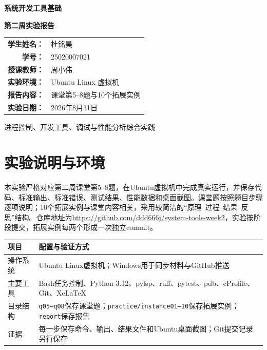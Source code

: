 \documentclass[UTF8,a4paper,11pt]{ctexart}
\begin{document}
\begin{titlepage}\centering
\vspace*{1.8cm}{\Large 计算机科学与技术学院\par}\vspace{1.3cm}
{\Huge\bfseries 系统开发工具基础\par}\vspace{.4cm}
{\LARGE\bfseries 第二周实验报告\par}\vspace{2cm}
\renewcommand{\arraystretch}{1.7}
\begin{tabular}{>{\bfseries}rl}
学生姓名：&杜铭昊\\学号：&25020007021\\授课教师：&周小伟\\
实验环境：&Ubuntu Linux 虚拟机\\报告内容：&课堂第5--8题与10个拓展实例\\
实验日期：&2026年8月31日
\end{tabular}
\vfill{\large 进程控制、开发工具、调试与性能分析综合实践\par}
\end{titlepage}

\tableofcontents\clearpage

\section{实验说明与环境}
本实验严格对应第二周课堂第5--8题，在Ubuntu虚拟机中完成真实运行，并保存代码、标准输出、标准错误、测试结果、性能数据和桌面截图。课堂题按照题目步骤逐项说明；10个拓展实例与课堂内容相关，采用较简洁的“原理--过程--结果--反思”结构。仓库地址为\url{https://github.com/ddd666j/system-tools-week2}，实验按阶段提交，拓展实例每两个形成一次独立commit。

\begin{table}[H]\centering
\begin{tabularx}{\textwidth}{@{}lX@{}}\toprule
项目 & 配置与验证方式\\\midrule
操作系统 & Ubuntu Linux虚拟机；Windows用于同步材料与GitHub推送\\
主要工具 & Bash任务控制、Python 3.12、pylsp、ruff、pytest、pdb、cProfile、Git、XeLaTeX\\
目录结构 & \texttt{q05--q08}保存课堂题；\texttt{practice/instance01--10}保存拓展实例；\texttt{report}保存报告\\
证据 & 每一步保存命令、输出、结果文件和Ubuntu桌面截图；Git提交记录另行保存\\\bottomrule
\end{tabularx}\end{table}
\end{document}
